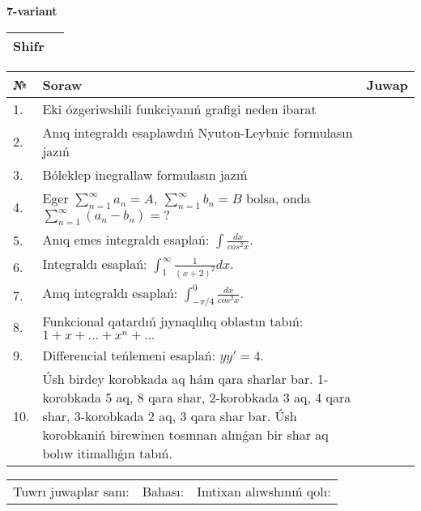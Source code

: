 \documentclass{article}
\begin{document}
  \egroup
  
  \newpage
  
  
  \textbf{7-variant}\\
  
  \bgroup
  \def\arraystretch{1.6} %
  
  \begin{tabular}{|m{5.7cm}|m{9.5cm}|}
  \hline
  Shifr & \\
  \hline
  \end{tabular}
  
  \vspace{1cm}
  
  \begin{tabular}{|m{0.7cm}|m{10cm}|m{4cm}|}
  \hline
  № & Soraw & Juwap \\
  \hline
  1. & Eki ózgeriwshili funkciyanıń grafigi neden ibarat &  \\
  \hline
  2. & Anıq integraldı esaplawdıń Nyuton-Leybnic formulasın jazıń &  \\
  \hline
  3. & Bóleklep inegrallaw formulasın jazıń &  \\
  \hline
  4. & Eger \(\sum_{n = 1}^{\infty}a_{n} = A,\ \sum_{n = 1}^{\infty}b_{n} = B\) bolsa, onda \(\sum_{n = 1}^{\infty}\left( a_{n} - b_{n} \right) = ?\) &  \\
  \hline
  5. & Anıq emes integraldı esaplań: \(\int\frac{dx}{cos^2 x}\). &  \\
  \hline
  6. & Integraldı esaplań: \(\int_{1}^{\infty}{\frac{1}{(x + 2)^2 }dx}\). &  \\
  \hline
  7. & Anıq integraldı esaplań: \(\int_{- \pi/4}^{0}\frac{dx}{cos^2 x}\). &  \\
  \hline
  8. & Funkcional qatardıń jıynaqlılıq oblastın tabıń:\(1 + x + ... + x^{n} + ...\) &  \\
  \hline
  9. & Differencial teńlemeni esaplań: \(yy' = 4\). &  \\
  \hline
  10. & Úsh birdey korobkada aq hám qara sharlar bar. 1-korobkada 5 aq, 8 qara shar, 2-korobkada 3 aq, 4 qara shar, 3-korobkada 2 aq, 3 qara shar bar. Úsh korobkaniń birewinen tosınnan alınǵan bir shar aq bolıw itimallıǵın tabıń. &  \\
  \hline
  \end{tabular}
  
  \vspace{1cm}
  
  \begin{tabular}{lll}
  Tuwrı juwaplar sanı: \underline{\hspace{1.5cm}} & 
  Bahası: \underline{\hspace{1.5cm}} & 
  Imtixan alıwshınıń qolı: \underline{\hspace{2cm}} \\
  \end{tabular}
  
\end{document}
